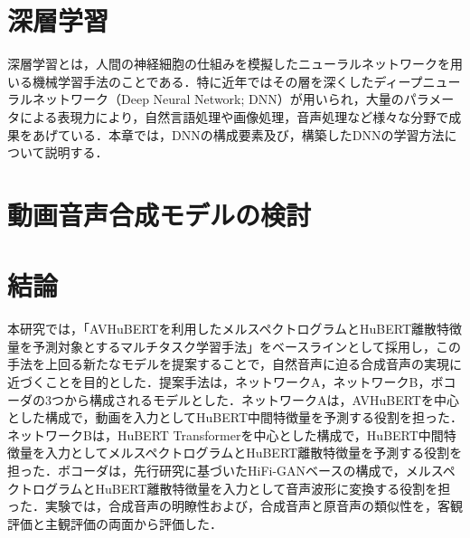 \documentclass[12pt]{jarticle}
\numberwithin{equation}{section}    %
\numberwithin{figure}{section}      %
\numberwithin{table}{section}      %
\begin{document}
\clearpage

\setcounter{tocdepth}{3}
\tableofcontents
\thispagestyle{empty}
\clearpage

\pagestyle{plain}
\setcounter{page}{1}


\clearpage


\clearpage

\section{深層学習}
深層学習とは，人間の神経細胞の仕組みを模擬したニューラルネットワークを用いる機械学習手法のことである．特に近年ではその層を深くしたディープニューラルネットワーク（Deep Neural Network; DNN）が用いられ，大量のパラメータによる表現力により，自然言語処理や画像処理，音声処理など様々な分野で成果をあげている．本章では，DNNの構成要素及び，構築したDNNの学習方法について説明する．



\clearpage

\section{動画音声合成モデルの検討}





\clearpage

\section{結論}
本研究では，「AVHuBERTを利用したメルスペクトログラムとHuBERT離散特徴量を予測対象とするマルチタスク学習手法」をベースラインとして採用し，この手法を上回る新たなモデルを提案することで，自然音声に迫る合成音声の実現に近づくことを目的とした．提案手法は，ネットワークA，ネットワークB，ボコーダの3つから構成されるモデルとした．ネットワークAは，AVHuBERTを中心とした構成で，動画を入力としてHuBERT中間特徴量を予測する役割を担った．ネットワークBは，HuBERT Transformerを中心とした構成で，HuBERT中間特徴量を入力としてメルスペクトログラムとHuBERT離散特徴量を予測する役割を担った．ボコーダは，先行研究に基づいたHiFi-GANベースの構成で，メルスペクトログラムとHuBERT離散特徴量を入力として音声波形に変換する役割を担った．実験では，合成音声の明瞭性および，合成音声と原音声の類似性を，客観評価と主観評価の両面から評価した．
\end{document}
